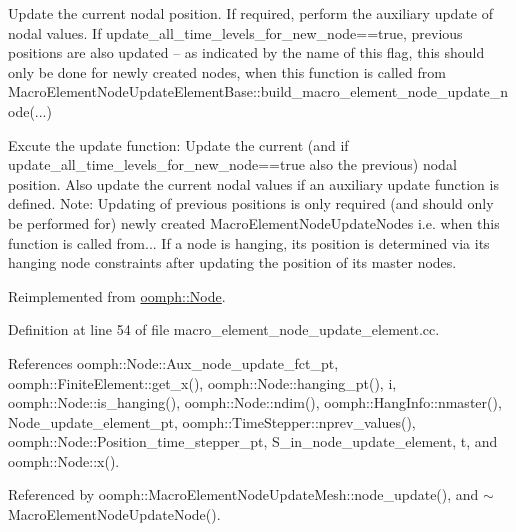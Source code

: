 Update the current nodal position. If required, perform the auxiliary update of nodal values. If update\+\_\+all\+\_\+time\+\_\+levels\+\_\+for\+\_\+new\+\_\+node==true, previous positions are also updated -- as indicated by the name of this flag, this should only be done for newly created nodes, when this function is called from Macro\+Element\+Node\+Update\+Element\+Base\+::build\+\_\+macro\+\_\+element\+\_\+node\+\_\+update\+\_\+node(...) 

Excute the update function\+: Update the current (and if update\+\_\+all\+\_\+time\+\_\+levels\+\_\+for\+\_\+new\+\_\+node==true also the previous) nodal position. Also update the current nodal values if an auxiliary update function is defined. Note\+: Updating of previous positions is only required (and should only be performed for) newly created Macro\+Element\+Node\+Update\+Nodes i.\+e. when this function is called from... If a node is hanging, its position is determined via its hanging node constraints after updating the position of its master nodes. 

Reimplemented from \hyperlink{classoomph_1_1Node_aecf8c979266300d3609de2b4ddfa3cc8}{oomph\+::\+Node}.



Definition at line 54 of file macro\+\_\+element\+\_\+node\+\_\+update\+\_\+element.\+cc.



References oomph\+::\+Node\+::\+Aux\+\_\+node\+\_\+update\+\_\+fct\+\_\+pt, oomph\+::\+Finite\+Element\+::get\+\_\+x(), oomph\+::\+Node\+::hanging\+\_\+pt(), i, oomph\+::\+Node\+::is\+\_\+hanging(), oomph\+::\+Node\+::ndim(), oomph\+::\+Hang\+Info\+::nmaster(), Node\+\_\+update\+\_\+element\+\_\+pt, oomph\+::\+Time\+Stepper\+::nprev\+\_\+values(), oomph\+::\+Node\+::\+Position\+\_\+time\+\_\+stepper\+\_\+pt, S\+\_\+in\+\_\+node\+\_\+update\+\_\+element, t, and oomph\+::\+Node\+::x().



Referenced by oomph\+::\+Macro\+Element\+Node\+Update\+Mesh\+::node\+\_\+update(), and $\sim$\+Macro\+Element\+Node\+Update\+Node().

\mbox{\label{classoomph_1_1MacroElementNodeUpdateNode_a42cf903a08c77142beb14087d768437d}} 
